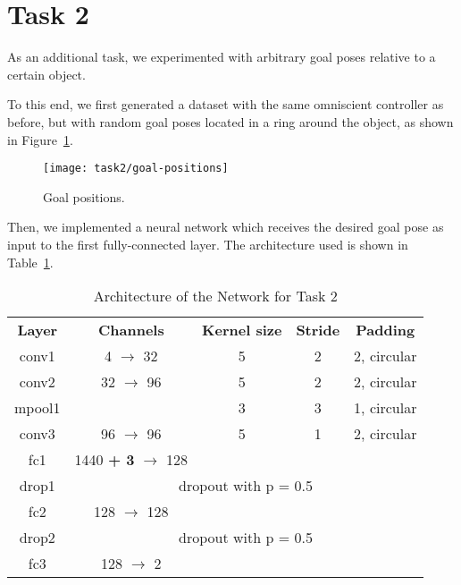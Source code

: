 \section{Task 2}
As an additional task, we experimented with arbitrary goal poses relative to a 
certain object. 

To this end, we first generated a dataset with the same omniscient controller 
as before, but with random goal poses located in a ring around the object, as 
shown in Figure~\ref{fig:goal-positions}.

\begin{figure}[htbp]
	\centerline{\texttt{[image: task2/goal-positions]}}
	\caption{Goal positions.}
	\label{fig:goal-positions}
\end{figure}

Then, we implemented a neural network which receives the desired goal pose as 
input to the first fully-connected layer. The architecture used is shown in 
Table~\ref{tab: task 2}.

\begin{table}[htbp]
	\caption{Architecture of the Network for Task 2}
	\begin{center}
		\begin{tabular}{|c|c|c|c|c|}
			\hline
			\textbf{Layer}&\textbf{Channels} &\textbf{Kernel size} 
			&\textbf{Stride} &\textbf{Padding}\\
			\cline{1-5}
			conv1  &  4 $\rightarrow$ 	32 & 5 & 2 & 2, circular \\ \hline
			conv2  & 32 $\rightarrow$  	96 & 5 & 2 & 2, circular \\ \hline
			mpool1 & 					   & 3	& 3 & 1, circular \\ 
			\hline			
			conv3  & 96 $\rightarrow$  	96 & 5 & 1 & 2, circular \\ \hline
			fc1   &  1440 \textbf{+ 3} $\rightarrow$ 128 &  &  &  \\ \hline
			drop1 & \multicolumn{4}{c|}{dropout with p = 0.5} \\ \hline
			fc2   &  128 $\rightarrow$ 128 &  &  &  \\ \hline
			 drop2 & \multicolumn{4}{c|}{ dropout with p = 0.5} \\ \hline
			fc3 &  128 $\rightarrow$   2 &  &  &  \\ \hline
		\end{tabular}
		\label{tab: task 2}
	\end{center}
\end{table}

